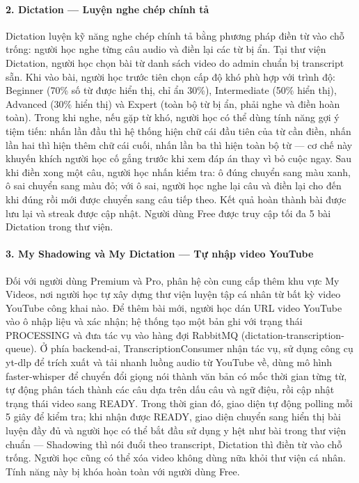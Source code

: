 \paragraph{2. Dictation --- Luyện nghe chép chính tả}

Dictation luyện kỹ năng nghe chép chính tả bằng phương pháp điền từ vào chỗ trống: người học nghe từng câu audio và điền lại các từ bị ẩn. Tại thư viện Dictation, người học chọn bài từ danh sách video do admin chuẩn bị transcript sẵn. Khi vào bài, người học trước tiên chọn cấp độ khó phù hợp với trình độ: Beginner (70\% số từ được hiển thị, chỉ ẩn 30\%), Intermediate (50\% hiển thị), Advanced (30\% hiển thị) và Expert (toàn bộ từ bị ẩn, phải nghe và điền hoàn toàn). Trong khi nghe, nếu gặp từ khó, người học có thể dùng tính năng gợi ý tiệm tiến: nhấn lần đầu thì hệ thống hiện chữ cái đầu tiên của từ cần điền, nhấn lần hai thì hiện thêm chữ cái cuối, nhấn lần ba thì hiện toàn bộ từ --- cơ chế này khuyến khích người học cố gắng trước khi xem đáp án thay vì bỏ cuộc ngay. Sau khi điền xong một câu, người học nhấn kiểm tra: ô đúng chuyển sang màu xanh, ô sai chuyển sang màu đỏ; với ô sai, người học nghe lại câu và điền lại cho đến khi đúng rồi mới được chuyển sang câu tiếp theo. Kết quả hoàn thành bài được lưu lại và streak được cập nhật. Người dùng Free được truy cập tối đa 5 bài Dictation trong thư viện.

\paragraph{3. My Shadowing và My Dictation --- Tự nhập video YouTube}

Đối với người dùng Premium và Pro, phân hệ còn cung cấp thêm khu vực My Videos, nơi người học tự xây dựng thư viện luyện tập cá nhân từ bất kỳ video YouTube công khai nào. Để thêm bài mới, người học dán URL video YouTube vào ô nhập liệu và xác nhận; hệ thống tạo một bản ghi với trạng thái PROCESSING và đưa tác vụ vào hàng đợi RabbitMQ (dictation-transcription-queue). Ở phía backend-ai, TranscriptionConsumer nhận tác vụ, sử dụng công cụ yt-dlp để trích xuất và tải nhanh luồng audio từ YouTube về, dùng mô hình faster-whisper để chuyển đổi giọng nói thành văn bản có mốc thời gian từng từ, tự động phân tách thành các câu dựa trên dấu câu và ngữ điệu, rồi cập nhật trạng thái video sang READY. Trong thời gian đó, giao diện tự động polling mỗi 5 giây để kiểm tra; khi nhận được READY, giao diện chuyển sang hiển thị bài luyện đầy đủ và người học có thể bắt đầu sử dụng y hệt như bài trong thư viện chuẩn --- Shadowing thì nói đuổi theo transcript, Dictation thì điền từ vào chỗ trống. Người học cũng có thể xóa video không dùng nữa khỏi thư viện cá nhân. Tính năng này bị khóa hoàn toàn với người dùng Free.

